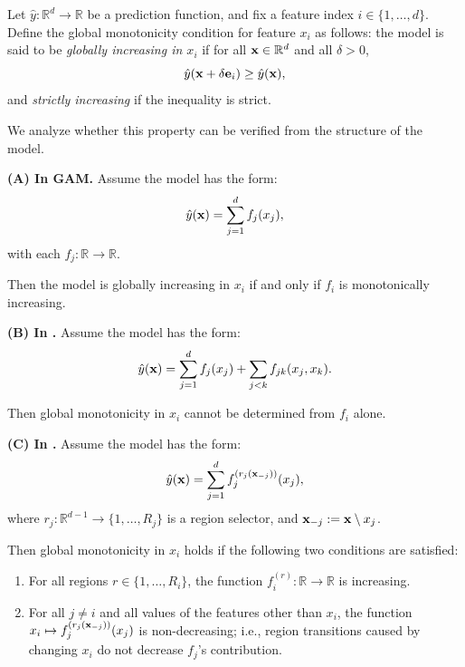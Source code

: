 \begin{proposition}

Let \( \hat{y} : \mathbb{R}^d \to \mathbb{R} \) be a prediction function, and fix a feature index \( i \in \{1, \dots, d\} \). Define the global monotonicity condition for feature \( x_i \) as follows: the model is said to be \emph{globally increasing in \( x_i \)} if for all \( \mathbf{x} \in \mathbb{R}^d \) and all \( \delta > 0 \),
\[
\hat{y}(\mathbf{x} + \delta \mathbf{e}_i) \ge \hat{y}(\mathbf{x}),
\]
and \emph{strictly increasing} if the inequality is strict.

We analyze whether this property can be verified from the structure of the model.

\textbf{(A) In GAM.}
Assume the model has the form:
\[
\hat{y}(\mathbf{x}) = \sum_{j=1}^d f_j(x_j),
\]
with each \( f_j : \mathbb{R} \to \mathbb{R} \).

Then the model is globally increasing in \( x_i \) if and only if \( f_i \) is monotonically increasing.

\textbf{(B) In \gamm.}
Assume the model has the form:
\[
\hat{y}(\mathbf{x}) = \sum_{j=1}^d f_j(x_j) + \sum_{j<k} f_{jk}(x_j, x_k).
\]

Then global monotonicity in \( x_i \) cannot be determined from \( f_i \) alone.

\textbf{(C) In \method{}.}
Assume the model has the form:
\[
\hat{y}(\mathbf{x}) = \sum_{j=1}^d f_j^{(r_j(\mathbf{x}_{-j}))}(x_j),
\]
where \( r_j : \mathbb{R}^{d-1} \to \{1, \dots, R_j\} \) is a region selector, and \( \mathbf{x}_{-j} := \mathbf{x} \setminus x_j \).

Then global monotonicity in \( x_i \) holds  if the following two conditions are satisfied:
\begin{enumerate}
  \item For all regions \( r \in \{1, \dots, R_i\} \), the function \( f_i^{(r)} : \mathbb{R} \to \mathbb{R} \) is increasing.
  \item For all \( j \ne i \) and all values of the features other than \( x_i \), the function \( x_i \mapsto f_j^{(r_j(\mathbf{x}_{-j}))}(x_j) \) is non-decreasing; i.e., region transitions caused by changing \( x_i \) do not decrease \( f_j \)'s contribution.
\end{enumerate}

\end{proposition}

